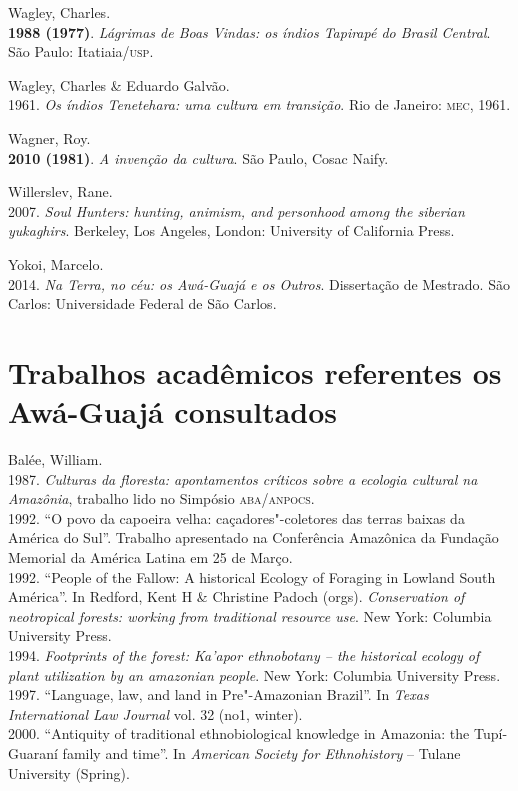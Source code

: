 \begin{bibliohedra}
Wagley, Charles.\\
\textbf{1988 (1977)}. \emph{Lágrimas de Boas Vindas: os índios Tapirapé
do Brasil Central}. São Paulo: Itatiaia/\textsc{usp}.

Wagley, Charles \& Eduardo Galvão.\\
1961. \emph{Os índios Tenetehara: uma cultura em transição}.
Rio de Janeiro: \textsc{mec}, 1961.

Wagner, Roy.\\
\textbf{2010 (1981)}. \emph{A invenção da cultura}. São Paulo, Cosac
Naify.

Willerslev, Rane.\\
2007. \emph{Soul Hunters: hunting, animism, and personhood
among the siberian yukaghirs}. Berkeley, Los Angeles, London: University
of California Press.

Yokoi, Marcelo.\\
2014. \emph{Na Terra, no céu: os Awá-Guajá e os Outros}.
Dissertação de Mestrado. São Carlos: Universidade Federal de São Carlos.

\section{Trabalhos acadêmicos referentes os Awá-Guajá consultados}

Balée, William.\\
1987. \emph{Culturas da floresta: apontamentos críticos
sobre a ecologia cultural na Amazônia}, trabalho lido no Simpósio
\textsc{aba}/\textsc{anpocs}.\\
1992. ``O povo da capoeira velha: caçadores"-coletores
das terras baixas da América do Sul''. Trabalho apresentado na
Conferência Amazônica da Fundação Memorial da América Latina em 25 de
Março.\\
1992. ``People of the Fallow: A historical Ecology of
Foraging in Lowland South América''. In Redford, Kent H \& Christine
Padoch (orgs). \emph{Conservation of neotropical forests: working from
traditional resource use}. New York: Columbia University Press.\\
1994. \emph{Footprints of the forest: Ka'apor
ethnobotany -- the historical ecology of plant utilization by an
amazonian people}. New York: Columbia University Press.\\
1997. ``Language, law, and land in Pre"-Amazonian
Brazil''. In \emph{Texas International Law Journal} vol. 32 (no1,
winter).\\
2000. ``Antiquity of traditional ethnobiological
knowledge in Amazonia: the Tupí-Guaraní family and time''. In
\emph{American Society for Ethnohistory} -- Tulane University (Spring).


\end{bibliohedra}

